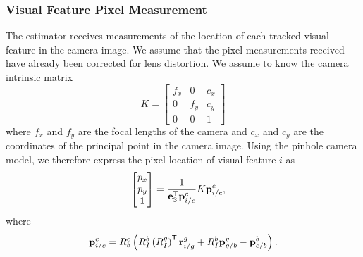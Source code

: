 \subsubsection{Visual Feature Pixel Measurement}
The estimator receives measurements of
the location of each tracked visual feature in the camera image. We assume that the
pixel measurements received have already been corrected for lens distortion.
We assume to know the camera intrinsic matrix
\begin{equation}
  K =
  \begin{bmatrix}
    f_x & 0 & c_x \\
    0 & f_y & c_y \\
    0 & 0 & 1
  \end{bmatrix}
\end{equation}
where $f_x$ and $f_y$ are the focal lengths of the camera and $c_x$ and $c_y$
are the coordinates of the principal point in the camera image.
Using the pinhole camera model, we therefore express the pixel location of
visual feature $i$ as
\begin{align}
  \begin{bmatrix}
    p_x \\ p_y \\ 1
  \end{bmatrix} &= \frac{1}{\boldsymbol{\mathrm{e}}_3^{\mathsf{T}} \boldsymbol{\mathrm{p}}_{i/c}^c} K
  \boldsymbol{\mathrm{p}}_{i/c}^c,
\end{align}
where
\begin{align}
  \boldsymbol{\mathrm{p}}_{i/c}^c = R_b^c \left( R_I^b \left( R_I^g \right)^{\mathsf{T}}
  \boldsymbol{\mathrm{r}}_{i/g}^g + R_I^b \boldsymbol{\mathrm{p}}_{g/b}^v - \boldsymbol{\mathrm{p}}_{c/b}^b \right).
  \label{eq:p_i_c_c}
\end{align}
